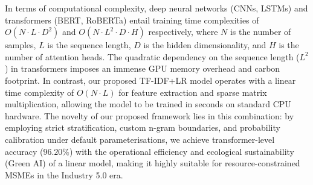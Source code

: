 \documentclass[authoryear,review,3p,times,12pt]{elsarticle}
\begin{document}
In terms of computational complexity, deep neural networks (CNNs, LSTMs) and transformers (BERT, RoBERTa) entail training time complexities of $O(N \cdot L \cdot D^2)$ and $O(N \cdot L^2 \cdot D \cdot H)$ respectively, where $N$ is the number of samples, $L$ is the sequence length, $D$ is the hidden dimensionality, and $H$ is the number of attention heads. The quadratic dependency on the sequence length ($L^2$) in transformers imposes an immense GPU memory overhead and carbon footprint. In contrast, our proposed TF-IDF+LR model operates with a linear time complexity of $O(N \cdot L)$ for feature extraction and sparse matrix multiplication, allowing the model to be trained in seconds on standard CPU hardware. The novelty of our proposed framework lies in this combination: by employing strict stratification, custom n-gram boundaries, and probability calibration under default parameterisations, we achieve transformer-level accuracy ($96.20\%$) with the operational efficiency and ecological sustainability (Green AI) of a linear model, making it highly suitable for resource-constrained MSMEs in the Industry 5.0 era. 
\end{document}
